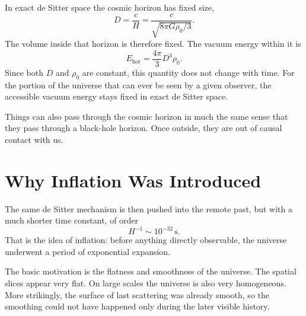 In exact de Sitter space the cosmic horizon has fixed size,
\begin{equation}
D=\frac{c}{H}
=\frac{c}{\sqrt{8\pi G\rho_0/3}}.
\end{equation}
The volume inside that horizon is therefore fixed. The vacuum energy within it is
\begin{equation}
E_{\mathrm{hor}}=\frac{4\pi}{3}D^3\rho_0.
\end{equation}
Since both \(D\) and \(\rho_0\) are constant, this quantity does not change with time. For the portion of the universe that can ever be seen by a given observer, the accessible vacuum energy stays fixed in exact de Sitter space.

Things can also pass through the cosmic horizon in much the same sense that they pass through a black-hole horizon. Once outside, they are out of causal contact with us.

\begin{classroomqa}
\end{classroomqa}

\section{Why Inflation Was Introduced}

The same de Sitter mechanism is then pushed into the remote past, but with a much shorter time constant, of order
\begin{equation}
H^{-1}\sim 10^{-32}\,\mathrm{s}.
\end{equation}
That is the idea of inflation: before anything directly observable, the universe underwent a period of exponential expansion.

The basic motivation is the flatness and smoothness of the universe. The spatial slices appear very flat. On large scales the universe is also very homogeneous. More strikingly, the surface of last scattering was already smooth, so the smoothing could not have happened only during the later visible history.

